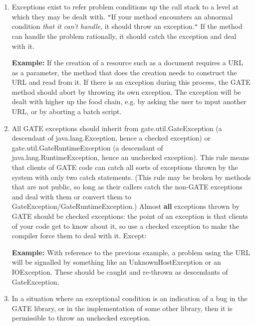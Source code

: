 \begin{enumerate}
\item 
Exceptions exist to refer problem conditions up the call stack to a level at
which they may be dealt with.
{\tt{}"{}}If your method encounters an abnormal condition {\em that it can't handle},
it should throw an exception.{\tt{}"{}} If the method can handle the problem rationally,
it should catch the exception and deal with it.\newline

{\bf Example:}\newline
If the creation of a resource such as a document requires a URL as a parameter,
the method that does the creation needs to construct the URL and read from it. If
there is an exception during this process, the GATE method should abort by throwing
its own exception. The exception will be dealt with higher up the food chain, e.g. 
by asking the user to input another URL, or by aborting a batch script.

\item 
All GATE exceptions should inherit from gate.util.GateException (a descendant of
java.lang.Exception, hence a checked exception) or
gate.util.GateRuntimeException (a descendant of java.lang.RuntimeException,
hence an unchecked exception). This rule means that clients of GATE code can
catch all sorts of exceptions thrown by the system with only two catch
statements. (This rule may be broken by methods that are not public, so long as
their callers catch the non-GATE exceptions and deal with them or convert them
to GateException/GateRuntimeException.)
Almost {\bf all} exceptions thrown by GATE should be checked exceptions: the
point of an exception is that clients of your code get to know about it, so use
a checked exception to make the compiler force them to deal with it. Except:\newline

{\bf Example:}\newline
With reference to the previous example, a problem using the URL will be
signalled by something like an UnknownHostException or an IOException. These
should be caught and re-thrown as descendants of GateException.

\item 
In a situation where an exceptional condition is an indication of a bug in the
GATE library, or in the implementation of some other library, then it is
permissible to throw an unchecked exception.\newline


\end{enumerate}

